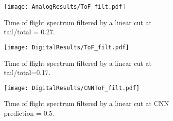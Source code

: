 \documentclass[main.tex]{subfiles}
\begin{document}
\begin{figure}
    \centering
    \begin{subfigure}[bh]{\textwidth}
   	   	\centering
	    \texttt{[image: AnalogResults/ToF\_filt.pdf]}
        \label{fig:ToF_filt_A}
    	\caption{Time of flight spectrum filtered by a linear cut at tail/total = 0.27.}
    	\label{fig:tof_cc_cnn}
   	\end{subfigure}
    \begin{subfigure}[bh]{\textwidth}
   	    \centering
        \texttt{[image: DigitalResults/ToF\_filt.pdf]}
        \caption{Time of flight spectrum filtered by a linear cut at tail/total=0.17.}
        \label{fig:ToF_filt_D}
    \end{subfigure}
	\begin{subfigure}[bh]{\textwidth}
	    \centering
        \texttt{[image: DigitalResults/CNNToF\_filt.pdf]}
        \caption{Time of flight spectrum filtered by a linear cut at CNN prediction = 0.5.}
        \label{fig:ToF_filt_D_CNN}
    \end{subfigure}
	
	\caption{}
    \label{fig:tof_cc_cnn}
\end{figure}
\end{document}
